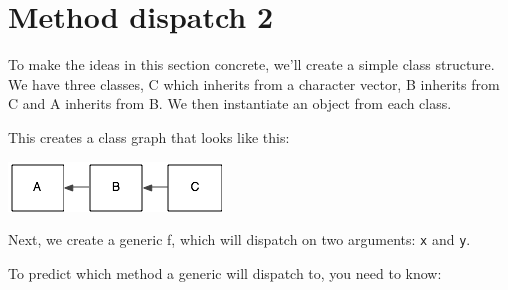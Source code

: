 \hypertarget{method-dispatch-2}{%
\section{Method dispatch 2}\label{method-dispatch-2}}

To make the ideas in this section concrete, we'll create a simple class
structure. We have three classes, C which inherits from a character
vector, B inherits from C and A inherits from B. We then instantiate an
object from each class.

\begin{Shaded}
\begin{Highlighting}[]
\NormalTok{(}\NormalTok{, } \NormalTok{)}
\NormalTok{(}\NormalTok{, } \NormalTok{)}
\NormalTok{(}\NormalTok{, } \NormalTok{)}

\StringTok{ }\NormalTok{(}\NormalTok{, }\NormalTok{)}
\StringTok{ }\NormalTok{(}\NormalTok{, }\NormalTok{)}
\StringTok{ }\NormalTok{(}\NormalTok{, }\NormalTok{)}
\end{Highlighting}
\end{Shaded}

This creates a class graph that looks like this:

\includegraphics{diagrams/class-graph-1.png}

Next, we create a generic f, which will dispatch on two arguments:
\texttt{x} and \texttt{y}.

\begin{Shaded}
\begin{Highlighting}[]
\NormalTok{(}\NormalTok{, }\NormalTok{(}\NormalTok{))}
\end{Highlighting}
\end{Shaded}

To predict which method a generic will dispatch to, you need to know:

